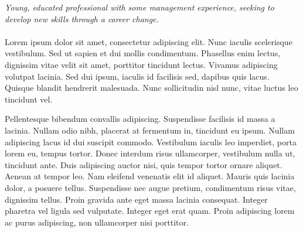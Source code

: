 \documentclass[10pt,letterpaper]{article} %
\begin{document}
\begin{multicols}{2}  %
\noindent \textit{Young, educated professional with some management experience, seeking to develop new skills through a career change.}\\\\

Lorem ipsum dolor sit amet, consectetur adipiscing elit. Nunc iaculis scelerisque vestibulum. Sed ut sapien et dui mollis condimentum. Phasellus enim lectus, dignissim vitae velit sit amet, porttitor tincidunt lectus. Vivamus adipiscing volutpat lacinia. Sed dui ipsum, iaculis id facilisis sed, dapibus quis lacus. Quisque blandit hendrerit malesuada. Nunc sollicitudin nisl nunc, vitae luctus leo tincidunt vel.

Pellentesque bibendum convallis adipiscing. Suspendisse facilisis id massa a lacinia. Nullam odio nibh, placerat at fermentum in, tincidunt eu ipsum. Nullam adipiscing lacus id dui suscipit commodo. Vestibulum iaculis leo imperdiet, porta lorem eu, tempus tortor. Donec interdum risus ullamcorper, vestibulum nulla ut, tincidunt ante. Duis adipiscing auctor nisi, quis tempor tortor ornare aliquet. Aenean at tempor leo. Nam eleifend venenatis elit id aliquet. Mauris quis lacinia dolor, a posuere tellus. Suspendisse nec augue pretium, condimentum risus vitae, dignissim tellus. Proin gravida ante eget massa lacinia consequat. Integer pharetra vel ligula sed vulputate. Integer eget erat quam. Proin adipiscing lorem ac purus adipiscing, non ullamcorper nisi porttitor. 



\end{multicols}

\spacedhrule{0.5em}{-0.4em} %

\end{document}

